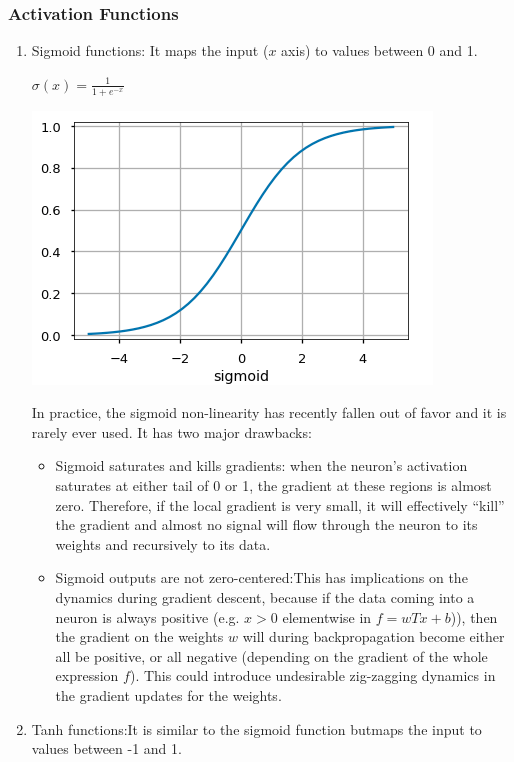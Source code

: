 \subsubsection{Activation Functions}
\begin{enumerate}
\item Sigmoid functions: It maps the input ($x$ axis) to values between 0 and 1.
\begin{center}
$
	\sigma(x) = \frac{1}{1+e^{-x}}
$
\end{center}
\begin{center}
\includegraphics[scale=0.5]{nn-sigmoid.png}
\end{center}
In practice, the sigmoid non-linearity has recently fallen out of favor and it is rarely ever used. It has two major drawbacks:
\begin{itemize}
\item Sigmoid saturates and kills gradients: when the neuron’s activation saturates at either tail of 0 or 1, the gradient at these regions is almost zero. Therefore, if the local gradient is very small, it will effectively “kill” the gradient and almost no signal will flow through the neuron to its weights and recursively to its data.
\item Sigmoid outputs are not zero-centered:This has implications on the dynamics during gradient descent, because if the data coming into a neuron is always positive (e.g. $x>0$ elementwise in $f=wTx+b$)), then the gradient on the weights $w$ will during backpropagation become either all be positive, or all negative (depending on the gradient of the whole expression $f$). This could introduce undesirable zig-zagging dynamics in the gradient updates for the weights.
\end{itemize}
\item Tanh functions:It is similar to the sigmoid function butmaps the input to values between -1 and 1.

\end{enumerate}
